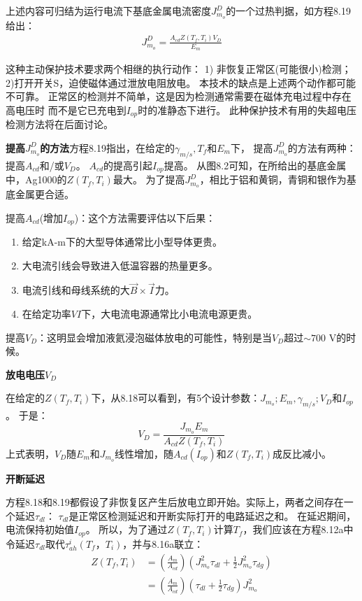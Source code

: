 上述内容可归结为运行电流下基底金属电流密度$J_{m_o}^D$的一个过热判据，如方程8.19给出：
\begin{align*}%
J_{m_o}^{D}=\frac{A_{cd}Z(T_f,T_i)V_D}{E_m}\tag{8.19}
\end{align*}

这种主动保护技术要求两个相继的执行动作：
1) 非恢复正常区(可能很小)检测；2)打开开关S，迫使磁体通过泄放电阻放电。
本技术的缺点是上述两个动作都可能不可靠。
正常区的检测并不简单，这是因为检测通常需要在磁体充电过程中存在高电压时
而不是它已充电到$I_{op}$时的准静态下进行。
此种保护技术有用的失超电压检测方法将在后面讨论。

\textbf{提高$J_{m_o}^D$的方法}\quad 方程8.19指出，在给定的$\gamma_{m/s}, T_f$和$E_m$下，
提高$J_{m_o}^D$的方法有两种：提高$A_{cd}$和/或$V_D$。
$A_{cd}$的提高引起$I_{op}$提高。
从图8.2可知，在所给出的基底金属中，Ag1000的$Z(T_f,T_i)$最大。
为了提高$J_{m_o}^D$，相比于铝和黄铜，青铜和银作为基底金属更合适。

提高$A_{cd}$(增加$I_{op}$)：这个方法需要评估以下后果：
\begin{enumerate}
	\item 给定kA-m下的大型导体通常比小型导体更贵。
	\item 大电流引线会导致进入低温容器的热量更多。
	\item 电流引线和母线系统的大$\vec{B}\times \vec{I}$力。
	\item 在给定功率$VI$下，大电流电源通常比小电流电源更贵。	
\end{enumerate}

提高$V_D$：这明显会增加液氦浸泡磁体放电的可能性，特别是当$V_D$超过$\sim 700$ V的时候。

\textbf{放电电压$V_D$}

在给定的$Z(T_f,T_i)$下，从8.18可以看到，有5个设计参数：$J_{m_o};E_m,\gamma_{m/s};V_D$和$I_{op}$。
于是：
\begin{equation}%
V_D=\frac{J_{m_o}E_m}{A_{cd}Z(T_f,T_i)}
\end{equation}
上式表明，$V_D$随$E_m$和$J_{m_o}$线性增加，随$A_{cd}(I_{op})$和$Z(T_f,T_i)$成反比减小。

\textbf{开断延迟}

方程8.18和8.19都假设了非恢复区产生后放电立即开始。实际上，两者之间存在一个延迟$\tau_{dl}$：
$\tau_{dl}$是正常区检测延迟和开断实际打开的电路延迟之和。
在延迟期间，电流保持初始值$I_{op}$。
所以，为了通过$Z(T_f,T_i)$计算$T_f$，我们应该在方程8.12a中令延迟$\tau_{dl}$取代$\tau_{ah}^i(T_f，T_i)$，并与8.16a联立：
\begin{subequations}
	\begin{align}
Z(T_f,T_i)&=\left(\frac{A_m}{A_{cd}}\right)(J_{m_o}^{2}\tau_{dl}+\frac{1}{2}J_{m_o}^{2}\tau_{dg})\\
&=\left(\frac{A_m}{A_{cd}}\right)(\tau_{dl}+\frac{1}{2}\tau_{dg})J_{m_o}^{2}
	\end{align}
\end{subequations}

